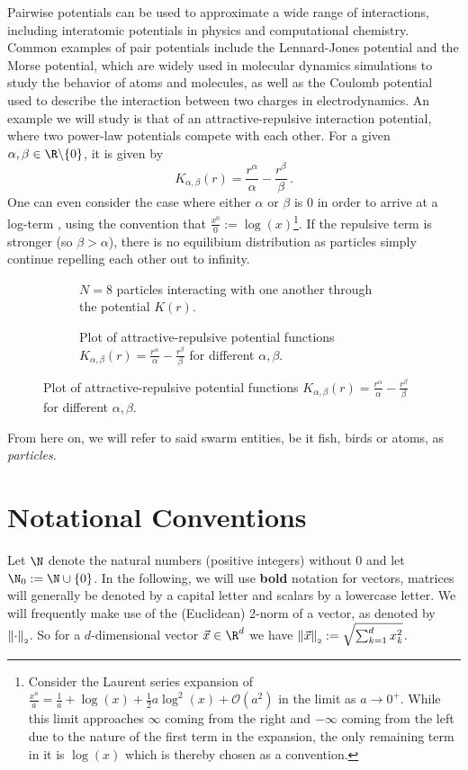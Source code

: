 Pairwise potentials can be used to approximate a wide range of interactions, including interatomic potentials in physics and computational chemistry.
Common examples of pair potentials include the Lennard-Jones potential and the Morse potential, which are widely used in molecular dynamics simulations to study the behavior of atoms and molecules, as well as the Coulomb potential used to describe the interaction between two charges in electrodynamics.
An example we will study is that of an attractive-repulsive interaction potential, where two power-law potentials compete with each other.
For a given $\alpha, \beta \in \R \backslash \{0\}$, it is given by
$$K_{\alpha, \beta}(r) = \frac{r^\alpha}{\alpha} - \frac{r^\beta}{\beta}\,.$$
One can even consider the case where either $\alpha$ or $\beta$ is 0 in order to arrive at a log-term \parencite{2017-explicit-solutions}, using the convention that $\frac{x^0}{0} := \log(x)$\footnote{
  Consider the Laurent series expansion of $\frac{x^a}{a} = \frac{1}{a} + \log(x) + \frac{1}{2}a \log^2(x) + \mathcal{O}(a^2)$ in the limit as $a \rightarrow 0^+$.
  While this limit approaches $\infty$ coming from the right and $-\infty$ coming from the left due to the nature of the first term in the expansion, the only remaining term in it is $\log(x)$ which is thereby chosen as a convention.
}.
If the repulsive term is stronger (so $\beta > \alpha$), there is no equilibium distribution as particles simply continue repelling each other out to infinity.

\begin{figure}[H]
  \centering
  \begin{subfigure}[t]{0.5\textwidth}
    \centering
    \caption{$N = 8$ particles interacting with one another through the potential $K(r)$.}
    \label{fig:problem-setting}
  \end{subfigure}
  \hfill
  \begin{subfigure}[t]{0.49\textwidth}
    \centering
    \caption{Plot of attractive-repulsive potential functions $K_{\alpha, \beta}(r) = \frac{r^\alpha}{\alpha} - \frac{r^\beta}{\beta}$ for different $\alpha, \beta$.}
    \label{fig:potential-function}
  \end{subfigure}
\end{figure}

From here on, we will refer to said swarm entities, be it fish, birds or atoms, as \textit{particles}.

\section{Notational Conventions}
Let $\N$ denote the natural numbers (positive integers) without $0$ and let $\N_0 := \N \cup \{0\}$.
In the following, we will use \textbf{bold} notation for vectors, matrices will generally be denoted by a capital letter and scalars by a lowercase letter.
We will frequently make use of the (Euclidean) 2-norm of a vector, as denoted by $\left\lVert\cdot\right\rVert_{\scriptscriptstyle 2}$.
So for a $d$-dimensional vector $\vec{x} \in \R^d$ we have $\left\lVert\vec{x}\right\rVert_{\scriptscriptstyle 2} := \sqrt{\sum_{k=1}^d x_k^2}$.

